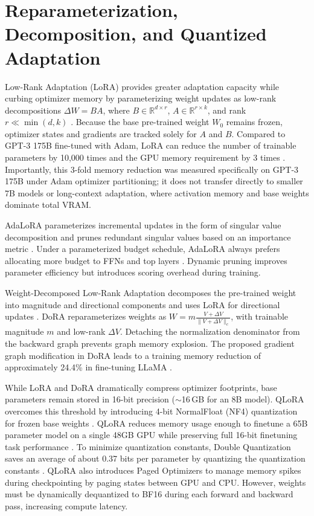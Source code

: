 \documentclass[11pt,a4paper]{article}
\begin{document}
\section{Reparameterization, Decomposition, and Quantized Adaptation}
Low-Rank Adaptation (LoRA) provides greater adaptation capacity while curbing optimizer memory by parameterizing weight updates as low-rank decompositions $\Delta W = B A$, where $B \in \mathbb{R}^{d \times r}$, $A \in \mathbb{R}^{r \times k}$, and rank $r \ll \min(d, k)$ \cite{hu2021lora}. Because the base pre-trained weight $W_0$ remains frozen, optimizer states and gradients are tracked solely for $A$ and $B$. Compared to GPT-3 175B fine-tuned with Adam, LoRA can reduce the number of trainable parameters by 10,000 times and the GPU memory requirement by 3 times \cite{hu2021lora}. Importantly, this 3-fold memory reduction was measured specifically on GPT-3 175B under Adam optimizer partitioning; it does not transfer directly to smaller 7B models or long-context adaptation, where activation memory and base weights dominate total VRAM.

AdaLoRA parameterizes incremental updates in the form of singular value decomposition and prunes redundant singular values based on an importance metric \cite{zhang2023adalora}. Under a parameterized budget schedule, AdaLoRA always prefers allocating more budget to FFNs and top layers \cite{zhang2023adalora}. Dynamic pruning improves parameter efficiency but introduces scoring overhead during training.

Weight-Decomposed Low-Rank Adaptation decomposes the pre-trained weight into magnitude and directional components and uses LoRA for directional updates \cite{liu2024dora}. DoRA reparameterizes weights as $W = m \frac{V + \Delta V}{\|V + \Delta V\|_c}$, with trainable magnitude $m$ and low-rank $\Delta V$. Detaching the normalization denominator from the backward graph prevents graph memory explosion. The proposed gradient graph modification in DoRA leads to a training memory reduction of approximately 24.4\% in fine-tuning LLaMA \cite{liu2024dora}.

While LoRA and DoRA dramatically compress optimizer footprints, base parameters remain stored in 16-bit precision ($\sim$16\,GB for an 8B model). QLoRA overcomes this threshold by introducing 4-bit NormalFloat (NF4) quantization for frozen base weights \cite{dettmers2023qlora}. QLoRA reduces memory usage enough to finetune a 65B parameter model on a single 48GB GPU while preserving full 16-bit finetuning task performance \cite{dettmers2023qlora}. To minimize quantization constants, Double Quantization saves an average of about 0.37 bits per parameter by quantizing the quantization constants \cite{dettmers2023qlora}. QLoRA also introduces Paged Optimizers to manage memory spikes during checkpointing by paging states between GPU and CPU. However, weights must be dynamically dequantized to BF16 during each forward and backward pass, increasing compute latency.
\end{document}
